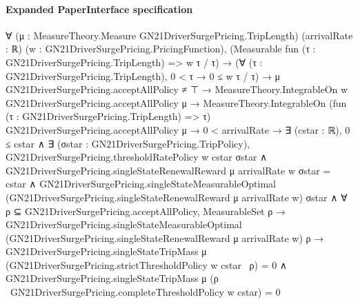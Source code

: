 \documentclass[10pt]{article}
\begin{document}
\paragraph{Expanded PaperInterface specification}
\begin{ReviewVerbatim}
∀ (μ : MeasureTheory.Measure GN21DriverSurgePricing.TripLength) (arrivalRate : ℝ)
  (w : GN21DriverSurgePricing.PricingFunction),
  (Measurable fun (τ : GN21DriverSurgePricing.TripLength) => w τ / τ) →
    (∀ (τ : GN21DriverSurgePricing.TripLength), 0 < τ → 0 ≤ w τ / τ) →
      μ GN21DriverSurgePricing.acceptAllPolicy ≠ ⊤ →
        MeasureTheory.IntegrableOn w GN21DriverSurgePricing.acceptAllPolicy μ →
          MeasureTheory.IntegrableOn (fun (τ : GN21DriverSurgePricing.TripLength) => τ)
              GN21DriverSurgePricing.acceptAllPolicy μ →
            0 < arrivalRate →
              ∃ (cstar : ℝ),
                0 ≤ cstar ∧
                  ∃ (σstar : GN21DriverSurgePricing.TripPolicy),
                    GN21DriverSurgePricing.thresholdRatePolicy w cstar σstar ∧
                      GN21DriverSurgePricing.singleStateRenewalReward μ arrivalRate w σstar = cstar ∧
                        GN21DriverSurgePricing.singleStateMeasurableOptimal
                            (GN21DriverSurgePricing.singleStateRenewalReward μ arrivalRate w) σstar ∧
                          ∀ ρ ⊆ GN21DriverSurgePricing.acceptAllPolicy,
                            MeasurableSet ρ →
                              GN21DriverSurgePricing.singleStateMeasurableOptimal
                                  (GN21DriverSurgePricing.singleStateRenewalReward μ arrivalRate w) ρ →
                                GN21DriverSurgePricing.singleStateTripMass μ
                                      (GN21DriverSurgePricing.strictThresholdPolicy w cstar \ ρ) =
                                    0 ∧
                                  GN21DriverSurgePricing.singleStateTripMass μ
                                      (ρ \ GN21DriverSurgePricing.completeThresholdPolicy w cstar) =
                                    0
\end{ReviewVerbatim}
\end{document}
